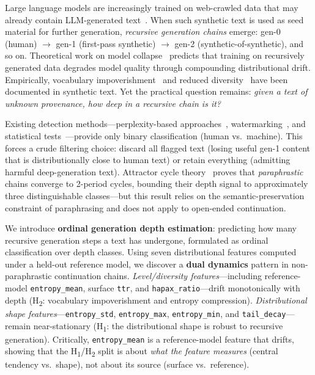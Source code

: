 \documentclass[letterpaper]{article}
\newcommand{\feat}[1]{\texttt{#1}}
\newcommand{\htwo}{H\textsubscript{2}}
\newcommand{\hone}{H\textsubscript{1}}
\begin{document}
Large language models are increasingly trained on web-crawled data that may already contain LLM-generated text~\citep{radford2019language,brown2020language}.
When such synthetic text is used as seed material for further generation, \emph{recursive generation chains} emerge: gen-0 (human) $\to$ gen-1 (first-pass synthetic) $\to$ gen-2 (synthetic-of-synthetic), and so on.
Theoretical work on model collapse~\citep{shumailov2024model,alemohammad2024selfconsuming,dohmatob2024model,gerstgrasser2024model} predicts that training on recursively generated data degrades model quality through compounding distributional drift.
Empirically, vocabulary impoverishment~\citep{guo2024curious,padmakumar2024does} and reduced diversity~\citep{holtzman2020curious} have been documented in synthetic text.
Yet the practical question remains: \emph{given a text of unknown provenance, how deep in a recursive chain is it?}

Existing detection methods---perplexity-based approaches~\citep{mitchell2023detectgpt,bao2024fastdetectgpt,hans2024binoculars}, watermarking~\citep{kirchenbauer2023watermark}, and statistical tests~\citep{su2023detectllm,tulchinskii2024ldscore}---provide only binary classification (human vs.\ machine).
This forces a crude filtering choice: discard all flagged text (losing useful gen-1 content that is distributionally close to human text) or retain everything (admitting harmful deep-generation text).
Attractor cycle theory~\citep{bertrand2023stability} proves that \emph{paraphrastic} chains converge to 2-period cycles, bounding their depth signal to approximately three distinguishable classes---but this result relies on the semantic-preservation constraint of paraphrasing and does not apply to open-ended continuation.

We introduce \textbf{ordinal generation depth estimation}: predicting how many recursive generation steps a text has undergone, formulated as ordinal classification over depth classes.
Using seven distributional features computed under a held-out reference model, we discover a \textbf{dual dynamics} pattern in non-paraphrastic continuation chains.
\emph{Level/diversity features}---including reference-model \feat{entropy\_mean}, surface \feat{ttr}, and \feat{hapax\_ratio}---drift monotonically with depth (\htwo{}: vocabulary impoverishment and entropy compression).
\emph{Distributional shape features}---\feat{entropy\_std}, \feat{entropy\_max}, \feat{entropy\_min}, and \feat{tail\_decay}---remain near-stationary (\hone{}: the distributional shape is robust to recursive generation).
Critically, \feat{entropy\_mean} is a reference-model feature that drifts, showing that the \hone{}/\htwo{} split is about \emph{what the feature measures} (central tendency vs.\ shape), not about its source (surface vs.\ reference).
\end{document}
